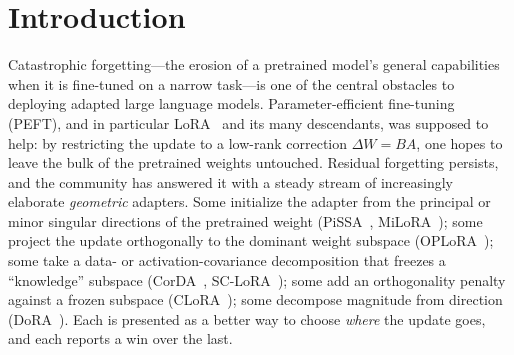 \documentclass[11pt]{article}
\newcommand{\dw}{F_{\Delta}}
\begin{document}
\begin{abstract}
of 7). \textbf{Message:} control the size of the update first; adapter geometry
mostly sets \emph{where} on the magnitude curve a method starts, not a separate
axis of forgetting. The evidence is a
complete Llama-2-7B commonsense learning-rate grid (8 adapters $\times$ 7 rates
$=$ 56 cells, 49 clean after withholding CorDA) with three-seed error bars on the
headline operating points, a five-adapter math grid plus a faithful-recipe math
reproduction, and a complete Qwen2.5-7B commonsense replication on its own scale
(7 adapters $\times$ 7 rates $=$ 49 cells, pooled $r\!=\!-0.86$, single seed),
with a qualitative single-seed Qwen math replication ($n\!=\!56$ cells on BBH
retention, $r\!=\!-0.70$, slope $-14.4$\,pp/decade, inside the cross-domain
slope band).
Even if the still-open controls later shift the rankings, the measurement
contribution stands: the fair $\dw$ axis and the sweep-as-instrument decompose any
adapter's apparent win into a magnitude effect plus a learning-rate-tuning
artifact.
\end{abstract}

\section{Introduction}\label{sec:intro}
Catastrophic forgetting---the erosion of a pretrained model's general
capabilities when it is fine-tuned on a narrow task---is one of the central
obstacles to deploying adapted large language models. Parameter-efficient
fine-tuning (PEFT), and in particular LoRA~\citep{hu2021lora} and its many
descendants, was supposed to help: by restricting the update to a low-rank
correction $\Delta W = BA$, one hopes to leave the bulk of the pretrained weights
untouched. Residual forgetting persists, and the community has answered it with a
steady stream of increasingly elaborate \emph{geometric} adapters. Some initialize
the adapter from the principal or minor singular directions of the pretrained
weight (PiSSA~\citep{meng2024pissa}, MiLoRA~\citep{wang2024milora}); some project
the update orthogonally to the dominant weight subspace
(OPLoRA~\citep{xiong2025oplora}); some take a data- or activation-covariance
decomposition that freezes a ``knowledge'' subspace (CorDA~\citep{yang2024corda},
SC-LoRA~\citep{luo2025sclora}); some add an orthogonality penalty against a frozen
subspace (CLoRA~\citep{clora}); some decompose magnitude from direction
(DoRA~\citep{liu2024dora}). Each is presented as a better way to choose
\emph{where} the update goes, and each reports a win over the last.
\end{document}

